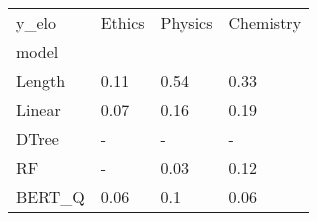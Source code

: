 \begin{tabular}{llll}
\toprule
y\_elo & Ethics & Physics & Chemistry \\
model  &        &         &           \\
\midrule
Length &   0.11 &    0.54 &      0.33 \\
Linear &   0.07 &    0.16 &      0.19 \\
DTree  &      - &       - &         - \\
RF     &      - &    0.03 &      0.12 \\
BERT\_Q &   0.06 &     0.1 &      0.06 \\
\bottomrule
\end{tabular}
